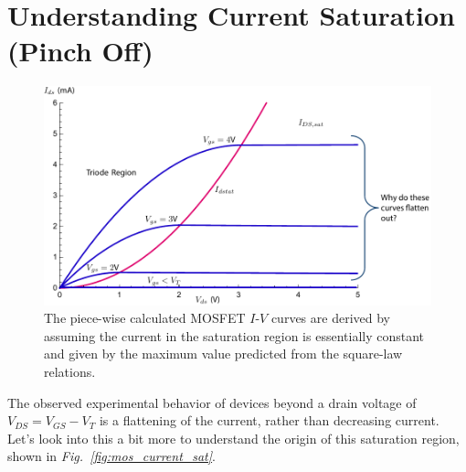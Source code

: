 \section{Understanding Current Saturation (Pinch Off)}
\begin{figure}[tb]
\centering
\includegraphics[width=.75\columnwidth]{ids_idsat_full} 
\caption{The piece-wise calculated MOSFET $I$-$V$ curves are derived by assuming the current in the saturation region is essentially constant and given by the maximum value predicted from the square-law relations.}
\label{fig:ids_family}
\end{figure}
The observed experimental behavior of devices beyond a drain voltage of $V_{DS} = V_{GS} - V_T$ is a flattening of the current, rather than decreasing current.  Let's look into this a bit more to understand the origin of this saturation region, shown in \emph{Fig.~\ref{fig:mos_current_sat}}.
